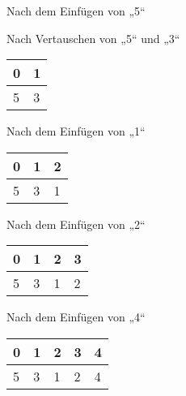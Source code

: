 \documentclass{bschlangaul-aufgabe}
\begin{document}
\begin{enumerate}
\begin{enumerate}
\begin{liDiagramm}{Nach dem Einfügen von „5“}
\end{liDiagramm}

\begin{liDiagramm}{Nach Vertauschen von „5“ und „3“}
\begin{tabular}{ll}
\bf{0} & \bf{1} \\
\hline
5      & 3      \\
\end{tabular}

\end{liDiagramm}

\begin{liDiagramm}{Nach dem Einfügen von „1“}
\begin{tabular}{lll}
\bf{0} & \bf{1} & \bf{2} \\
\hline
5      & 3      & 1      \\
\end{tabular}

\end{liDiagramm}

\begin{liDiagramm}{Nach dem Einfügen von „2“}
\begin{tabular}{llll}
\bf{0} & \bf{1} & \bf{2} & \bf{3} \\
\hline
5      & 3      & 1      & 2      \\
\end{tabular}

\end{liDiagramm}

\begin{liDiagramm}{Nach dem Einfügen von „4“}
\begin{tabular}{lllll}
\bf{0} & \bf{1} & \bf{2} & \bf{3} & \bf{4} \\
\hline
5      & 3      & 1      & 2      & 4      \\
\end{tabular}


\end{liDiagramm}
\end{enumerate}
\end{enumerate}
\end{document}
